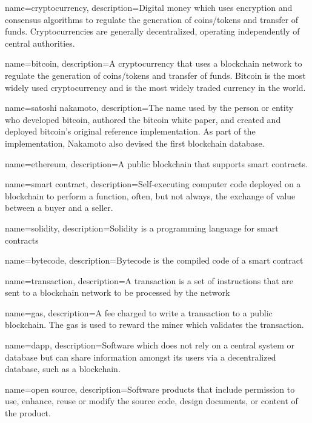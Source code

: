  {
	name=cryptocurrency,
	description={Digital money which uses encryption and consensus algorithms to regulate the generation of coins/tokens and transfer of funds. Cryptocurrencies are generally decentralized, operating independently of central authorities.}
}

 {
	name=bitcoin,
	description={A cryptocurrency that uses a blockchain network to regulate the generation of coins/tokens and transfer of funds. Bitcoin is the most widely used cryptocurrency and is the most widely traded currency in the world.}
}

 {
	name=satoshi nakamoto,
	description={The name used by the person or entity who developed bitcoin, authored the bitcoin white paper, and created and deployed bitcoin's original reference implementation. As part of the implementation, Nakamoto also devised the first blockchain database.}
}


 {
	name=ethereum,
	description={A public blockchain that supports smart contracts.}
}

 {
	name=smart contract,
	description={Self-executing computer code deployed on a blockchain to perform a function, often, but not always, the exchange of value between a buyer and a seller.}
}

 {
	name=solidity,
	description={Solidity is a programming language for smart contracts}
}

 {
	name=bytecode,
	description={Bytecode is the compiled code of a smart contract}
}

 {
	name=transaction,
	description={A transaction is a set of instructions that are sent to a blockchain network to be processed by the network}
}

 {
	name=gas,
	description={A fee charged to write a transaction to a public blockchain. The gas is used to reward the miner which validates the transaction.}
}

 {
	name=dapp,
	description={Software which does not rely on a central system or database but can share information amongst its users via a decentralized database, such as a blockchain.}
}

 {
	name=open source,
	description={Software products that include permission to use, enhance, reuse or modify the source code, design documents, or content of the product.}
}

